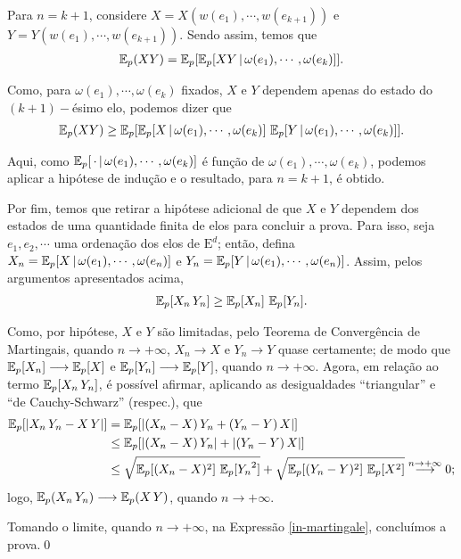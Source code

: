 \par Para $n = k + 1$, considere $X = X(w(e_1), \cdots, w(e_{k+1}))$ e $Y = Y(w(e_1), \cdots, w(e_{k+1}))$. Sendo assim, temos que
\begin{align*}
\operatorname{\mathbb{E}}_p(XY) = \operatorname{\mathbb{E}}_p[\operatorname{\mathbb{E}}_p[XY\,|\,\omega(e_{1}), \cdots, \omega(e_{k})]].
\end{align*}

\par Como, para $\omega(e_{1}), \cdots, \omega(e_{k})$ fixados, $X$ e $Y$ dependem apenas do estado do $(k+1)-$ésimo elo, podemos dizer que
\begin{align*}
\operatorname{\mathbb{E}}_p(XY) \geq \operatorname{\mathbb{E}}_p[\operatorname{\mathbb{E}}_p[X\,|\,\omega(e_{1}), \cdots, \omega(e_{k})] \, \operatorname{\mathbb{E}}_p[Y\,|\,\omega(e_{1}), \cdots, \omega(e_{k})]].
\end{align*}

\par Aqui, como $\operatorname{\mathbb{E}}_p[\,\cdot\,|\,\omega(e_{1}), \cdots, \omega(e_{k})]$ é função de $\omega(e_1), \cdots, \omega(e_{k})$, podemos aplicar a hipótese de indução e o resultado, para $n = k + 1$, é obtido.

\par Por fim, temos que retirar a hipótese adicional de que $X$ e $Y$ dependem dos estados de uma quantidade finita de elos para concluir a prova. Para isso, seja $e_1, e_2, \cdots$ uma ordenação dos elos de $\text{E}^d$; então, defina $X_n = \operatorname{\mathbb{E}}_p[X\,|\,\omega(e_1), \cdots, \omega(e_n)]$ e $Y_n = \operatorname{\mathbb{E}}_p[Y\,|\,\omega(e_1), \cdots, \omega(e_n)]$. Assim, pelos argumentos apresentados acima,
\begin{align} \label{in-martingale}
\operatorname{\mathbb{E}}_p[X_n\,Y_n] \geq \operatorname{\mathbb{E}}_p[X_n]\,\operatorname{\mathbb{E}}_p[Y_n].
\end{align}

\par Como, por hipótese, $X$ e $Y$ são limitadas, pelo Teorema de Convergência de Martingais, quando $n \rightarrow +\infty$, $X_n \longrightarrow X$ e $Y_n \longrightarrow Y$ quase certamente; de modo que $\operatorname{\mathbb{E}}_p[X_n] \longrightarrow \operatorname{\mathbb{E}}_p[X]$ e $\operatorname{\mathbb{E}}_p[Y_n] \longrightarrow \operatorname{\mathbb{E}}_p[Y]$, quando $n \rightarrow +\infty$. Agora, em relação ao termo $\operatorname{\mathbb{E}}_p[X_n\,Y_n]$, é possível afirmar, aplicando as desigualdades ``triangular'' e ``de Cauchy-Schwarz'' (respec.), que
\begin{align*}
\operatorname{\mathbb{E}}_p[|X_n\,Y_n - X\,Y|] &=    \operatorname{\mathbb{E}}_p[|(X_n - X) \, Y_n + (Y_n - Y) \, X|] \\
&\leq \operatorname{\mathbb{E}}_p[|(X_n - X) \, Y_n| + |(Y_n - Y) \, X|] \\
&\leq \sqrt{\operatorname{\mathbb{E}}_p[(X_n - X)^2] \, \operatorname{\mathbb{E}}_p[{Y_n}^2]} + \sqrt{\operatorname{\mathbb{E}}_p[(Y_n - Y)^2] \, \operatorname{\mathbb{E}}_p[{X}^2]} \overset{n\rightarrow+\infty}{\longrightarrow} 0;
\end{align*}
logo, $\operatorname{\mathbb{E}}_p(X_n\,Y_n) \longrightarrow \operatorname{\mathbb{E}}_p(X\,Y)$, quando $n \rightarrow +\infty$. 

\par Tomando o limite, quando $n \rightarrow +\infty$, na Expressão \eqref{in-martingale}, concluímos a prova.\hspace{\fill}\qed
\vspace{12pt}
